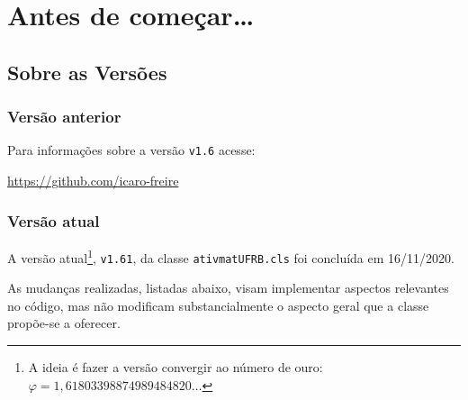 \section{Antes de começar\ldots}
%
\subsection{Sobre as Versões}
%
\subsubsection{Versão anterior} %
%
Para informações sobre a versão \texttt{v1.6} acesse: 
\begin{center}
  \href{https://github.com/icaro-freire}{https://github.com/icaro-freire} 
\end{center}

%
\subsubsection{Versão atual} %
%
A versão atual\footnote{A ideia é fazer a versão convergir ao número de ouro:
$\varphi = 1,61803 39887 49894 84820\ldots$},
\texttt{v1.61}, da classe \texttt{ativmatUFRB.cls} foi concluída em 16/11/2020.

As mudanças realizadas, listadas abaixo, visam implementar aspectos relevantes 
no código, mas não modificam substancialmente o aspecto geral que a classe 
propõe-se a oferecer.

